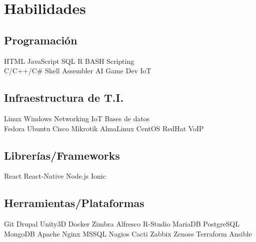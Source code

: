 \documentclass[]{plushcv}
\begin{document}
\hfill
\begin{minipage}[t]{0.25\textwidth} 


\section{Habilidades}
\subsection{Programación}
\sectionsep
{}
HTML \textbullet{} JavaScript \textbullet{} SQL \textbullet{} R \textbullet{} BASH Scripting \\
\sectionsep
{}
C/C++/C\# \textbullet{} Shell \textbullet{}  Assembler \textbullet{} AI \textbullet{} Game Dev \textbullet{} IoT \\
\sectionsep

\subsection{Infraestructura de T.I.}
Linux \textbullet{} Windows \textbullet{} Networking \textbullet{} IoT \textbullet{} Bases de datos \\
\sectionsep
{}
Fedora \textbullet{} Ubuntu \textbullet{} Cisco \textbullet{} Mikrotik \textbullet{} AlmaLinux \textbullet{} CentOS \textbullet{} RedHat \textbullet{} VoIP \\
\sectionsep


\subsection{Librerías/Frameworks}
\sectionsep
React \textbullet{} React-Native \textbullet{} Node.js \textbullet{} Ionic \\
\sectionsep
\sectionsep
\subsection{Herramientas/Plataformas}
\sectionsep
Git \textbullet{} Drupal \textbullet{} Unity3D \textbullet{} Docker \textbullet{} Zimbra \textbullet{} Alfresco \textbullet{} R-Studio \textbullet{} MariaDB \textbullet{} PostgreSQL \textbullet{} MongoDB \textbullet{} Apache \textbullet{} Nginx \textbullet{} MSSQL \textbullet{} Nagios \textbullet{} Cacti \textbullet{} Zabbix \textbullet{} Zenoss \textbullet{} Terraform \textbullet{} Ansible \\


\end{minipage}
\end{document}
